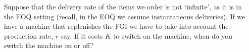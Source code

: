 \begin{exercise}
  Suppose that the delivery rate of the items we order is not
  `infinite', as it is in the EOQ setting (recall, in the EOQ we
  assume instantaneous deliveries). If we have a machine that
  replenishes the FGI we have to take into account the production
  rate, $r$ say. If it costs $K$ to switch on the machine, when do you switch the machine on or off?

\end{exercise}


